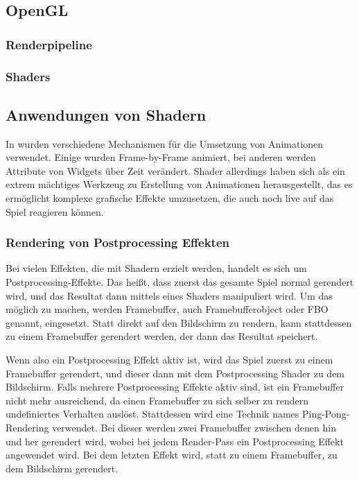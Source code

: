
\subsection{OpenGL}\label{subsec:opengl}

\renewcommand{\kapitelautor}{Autor: Marvin Kurka}

\subsubsection{Renderpipeline}

%
%

\subsubsection{Shaders}

%
%

\subsection{Anwendungen von Shadern}

In \FF wurden verschiedene Mechanismen für die Umsetzung von Animationen verwendet.
Einige wurden Frame-by-Frame animiert, bei anderen werden Attribute von Widgets über Zeit verändert.
Shader allerdings haben sich als ein extrem mächtiges Werkzeug zu Erstellung von Animationen herausgestellt, das es
ermöglicht komplexe grafische Effekte umzusetzen, die auch noch live auf das Spiel reagieren können.

\subsubsection{Rendering von Postprocessing Effekten}\label{subsubsec:postprocessing-effects}

Bei vielen Effekten, die mit Shadern erzielt werden, handelt es sich um Postprocessing-Effekte.
Das heißt, dass zuerst das gesamte Spiel normal gerendert wird, und das Resultat dann mittels eines Shaders
manipuliert wird.
Um das möglich zu machen, werden Framebuffer, auch Framebufferobject oder FBO genannt, eingesetzt.
Statt direkt auf den Bildschirm zu rendern, kann stattdessen zu einem Framebuffer gerendert werden, der dann das
Resultat speichert.\cite{openGlFbo}

Wenn also ein Postprocessing Effekt aktiv ist, wird das Spiel zuerst zu einem Framebuffer gerendert, und dieser dann
mit dem Postprocessing Shader zu dem Bildschirm.
Falls mehrere Postprocessing Effekte aktiv sind, ist ein Framebuffer nicht mehr ausreichend, da einen Framebuffer
zu sich selber zu rendern undefiniertes Verhalten auslöst.\cite{openGlFbo}
Stattdessen wird eine Technik names Ping-Pong-Rendering verwendet.\cite{pingPongRendering}
Bei dieser werden zwei Framebuffer zwischen denen hin und her gerendert wird, wobei bei jedem Render-Pass ein
Postprocessing Effekt angewendet wird.
Bei dem letzten Effekt wird, statt zu einem Framebuffer, zu dem Bildschirm gerendert.

